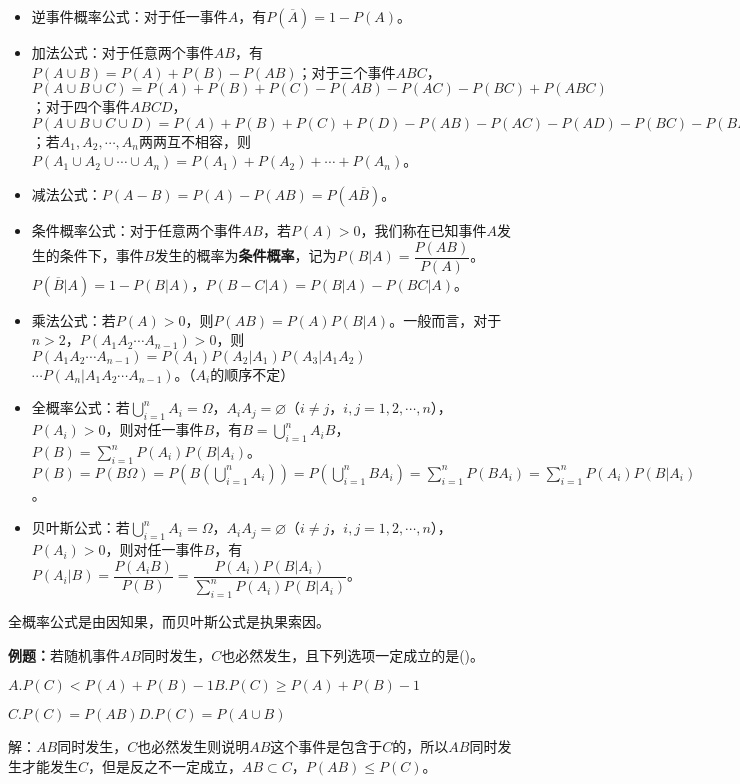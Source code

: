 \documentclass[UTF8, 12pt]{ctexart}
\begin{document}
\begin{itemize}
    \item 逆事件概率公式：对于任一事件$A$，有$P(\overline{A})=1-P(A)$。
    \item 加法公式：对于任意两个事件$AB$，有$P(A\cup B)=P(A)+P(B)-P(AB)$；对于三个事件$ABC$，$P(A\cup B\cup C)=P(A)+P(B)+P(C)-P(AB)-P(AC)-P(BC)+P(ABC)$；对于四个事件$ABCD$，$P(A\cup B\cup C\cup D)=P(A)+P(B)+P(C)+P(D)-P(AB)-P(AC)-P(AD)-P(BC)-P(BD)-P(CD)+P(ABC)+P(ABD)+P(ACD)+P(BCD)-P(ABCD)$；若$A_1,A_2,\cdots,A_n$两两互不相容，则$P(A_1\cup A_2\cup\cdots\cup A_n)=P(A_1)+P(A_2)+\cdots+P(A_n)$。
    \item 减法公式：$P(A-B)=P(A)-P(AB)=P(A\overline{B})$。
    \item 条件概率公式：对于任意两个事件$AB$，若$P(A)>0$，我们称在已知事件$A$发生的条件下，事件$B$发生的概率为\textbf{条件概率}，记为$P(B|A)=\dfrac{P(AB)}{P(A)}$。$P(\overline{B}|A)=1-P(B|A)$，$P(B-C|A)=P(B|A)-P(BC|A)$。
    \item 乘法公式：若$P(A)>0$，则$P(AB)=P(A)P(B|A)$。一般而言，对于$n>2$，$P(A_1A_2\cdots A_{n-1})>0$，则$P(A_1A_2\cdots A_{n-1})=P(A_1)P(A_2|A_1)P(A_3|A_1A_2)$\\$\cdots P(A_n|A_1A_2\cdots A_{n-1})$。（$A_i$的顺序不定）
    \item 全概率公式：若$\bigcup\limits_{i=1}^nA_i=\Omega$，$A_iA_j=\varnothing$（$i\neq j$，$i,j=1,2,\cdots,n$），$P(A_i)>0$，则对任一事件$B$，有$B=\bigcup\limits_{i=1}^nA_iB$，$P(B)=\sum\limits_{i=1}^nP(A_i)P(B|A_i)$。$P(B)=P(B\Omega)=P(B(\bigcup\limits_{i=1}^nA_i))=P(\bigcup\limits_{i=1}^nBA_i)=\sum\limits_{i=1}^nP(BA_i)=\sum\limits_{i=1}^nP(A_i)P(B|A_i)$。
    \item 贝叶斯公式：若$\bigcup\limits_{i=1}^nA_i=\Omega$，$A_iA_j=\varnothing$（$i\neq j$，$i,j=1,2,\cdots,n$），$P(A_i)>0$，则对任一事件$B$，有$P(A_i|B)=\dfrac{P(A_iB)}{P(B)}=\dfrac{P(A_i)P(B|A_i)}{\sum\limits_{i=1}^nP(A_i)P(B|A_i)}$。
\end{itemize}

全概率公式是由因知果，而贝叶斯公式是执果索因。

\textbf{例题：}若随机事件$AB$同时发生，$C$也必然发生，且下列选项一定成立的是()。

$A.P(C)<P(A)+P(B)-1$\qquad$B.P(C)\geqslant P(A)+P(B)-1$

$C.P(C)=P(AB)$\qquad$D.P(C)=P(A\cup B)$

解：$AB$同时发生，$C$也必然发生则说明$AB$这个事件是包含于$C$的，所以$AB$同时发生才能发生$C$，但是反之不一定成立，$AB\subset C$，$P(AB)\leqslant P(C)$。
\end{document}
